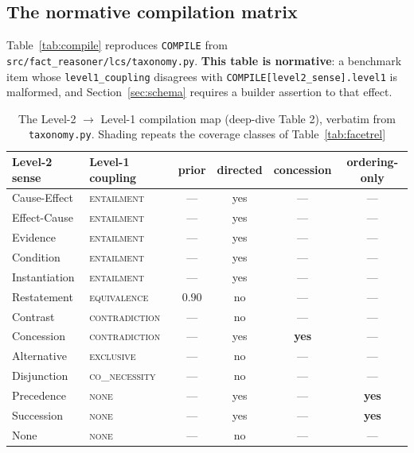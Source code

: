 \documentclass[11pt]{article}
\newcommand{\rNew}{\rowcolor{cNew}}
\newcommand{\rNoFactor}{\rowcolor{cGap}}
\newcommand{\cEnt}{\textsc{entailment}}
\newcommand{\cCon}{\textsc{contradiction}}
\newcommand{\cEqv}{\textsc{equivalence}}
\newcommand{\cExc}{\textsc{exclusive}}
\newcommand{\cCoN}{\textsc{co\_necessity}}
\newcommand{\cNone}{\textsc{none}}
\begin{document}
\clearpage

\subsection{The normative compilation matrix}
\label{sec:matrix}

Table~\ref{tab:compile} reproduces \texttt{COMPILE} from
\texttt{src/fact\_reasoner/lcs/taxonomy.py}. \textbf{This table is normative}: a benchmark
item whose \texttt{level1\_coupling} disagrees with
\texttt{COMPILE[level2\_sense].level1} is malformed, and Section~\ref{sec:schema} requires a
builder assertion to that effect.

\begin{table}[h]\centering\small
\renewcommand{\arraystretch}{1.1}
\begin{tabular}{@{}llcccc@{}}
\toprule
\textbf{Level-2 sense} & \textbf{Level-1 coupling} & \textbf{prior} &
\textbf{directed} & \textbf{concession} & \textbf{ordering-only}\\
\midrule
Cause-Effect  & \cEnt  & ---    & yes & --- & ---\\
Effect-Cause  & \cEnt  & ---    & yes & --- & ---\\
Evidence      & \cEnt  & ---    & yes & --- & ---\\
Condition     & \cEnt  & ---    & yes & --- & ---\\
\rNew Instantiation & \cEnt  & ---    & yes & --- & ---\\
\rNew Restatement   & \cEqv  & $0.90$ & no  & --- & ---\\
\rNew Contrast      & \cCon  & ---    & no  & --- & ---\\
\rNew Concession    & \cCon  & ---    & yes & \textbf{yes} & ---\\
\rNew Alternative   & \cExc  & ---    & no  & --- & ---\\
\rNew Disjunction   & \cCoN  & ---    & no  & --- & ---\\
\rNoFactor Precedence & \cNone & ---    & yes & --- & \textbf{yes}\\
\rNoFactor Succession & \cNone & ---    & yes & --- & \textbf{yes}\\
\rNoFactor None       & \cNone & ---    & no  & --- & ---\\
\bottomrule
\end{tabular}
\caption{The Level-2 $\rightarrow$ Level-1 compilation map (deep-dive Table 2), verbatim from
\texttt{taxonomy.py}. Shading repeats the coverage classes of Table~\ref{tab:facetrel}
}
\end{table}
\end{document}
